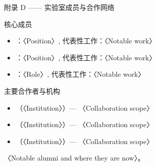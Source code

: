 \begin{frame}{附录 D —— 实验室成员与合作网络}
  \begin{block}{核心成员}
    \begin{itemize}
      \item {}：〈Position〉, 代表性工作：〈Notable work〉
      \item {}：〈Position〉, 代表性工作：〈Notable work〉
      \item {}：〈Role〉, 代表性工作：〈Notable work〉
    \end{itemize}
  \end{block}
  \tightgap
  \begin{block}{主要合作者与机构}
    \begin{itemize}
      \item {}（〈Institution〉）— 〈Collaboration scope〉
      \item {}（〈Institution〉）— 〈Collaboration scope〉
      \item {}（〈Institution〉）— 〈Collaboration scope〉
    \end{itemize}
  \end{block}
  \tightgap
  \begin{callout}[人才输出]
    〈Notable alumni and where they are now〉。
  \end{callout}
\end{frame}


